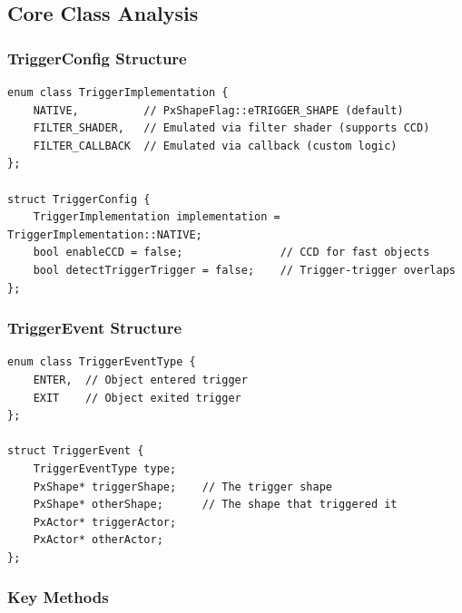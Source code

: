 
\subsection{Core Class Analysis}

\subsubsection{TriggerConfig Structure}

\begin{lstlisting}[caption={Trigger configuration}]
enum class TriggerImplementation {
    NATIVE,          // PxShapeFlag::eTRIGGER_SHAPE (default)
    FILTER_SHADER,   // Emulated via filter shader (supports CCD)
    FILTER_CALLBACK  // Emulated via callback (custom logic)
};

struct TriggerConfig {
    TriggerImplementation implementation = TriggerImplementation::NATIVE;
    bool enableCCD = false;               // CCD for fast objects
    bool detectTriggerTrigger = false;    // Trigger-trigger overlaps
};
\end{lstlisting}

\subsubsection{TriggerEvent Structure}

\begin{lstlisting}[caption={Trigger event data}]
enum class TriggerEventType {
    ENTER,  // Object entered trigger
    EXIT    // Object exited trigger
};

struct TriggerEvent {
    TriggerEventType type;
    PxShape* triggerShape;    // The trigger shape
    PxShape* otherShape;      // The shape that triggered it
    PxActor* triggerActor;
    PxActor* otherActor;
};
\end{lstlisting}

\subsubsection{Key Methods}

